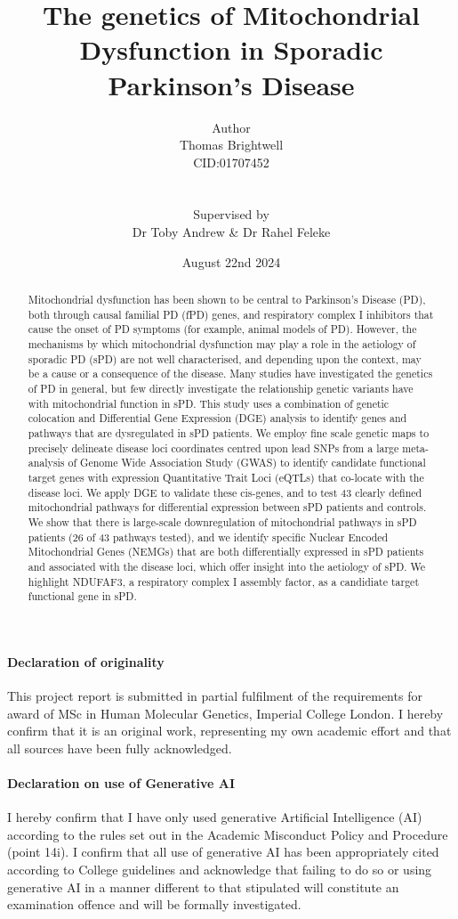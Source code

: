 \documentclass{article}
\title{\textbf{The genetics of Mitochondrial Dysfunction in Sporadic Parkinson's Disease}}
\author{Author
\\Thomas Brightwell
\\CID:01707452
\\
\\
\\Supervised by
\\Dr Toby Andrew & Dr Rahel Feleke}
\date{August 22nd 2024}
\begin{document}
\maketitle
\newpage
\paragraph{Declaration of originality}
This project report is submitted in partial fulfilment of the requirements for award of MSc in Human Molecular Genetics, Imperial College London. I hereby confirm that it is an original work, representing my own academic effort and that all sources have been fully acknowledged.
\paragraph{Declaration on use of Generative AI}
I hereby confirm that I have only used generative Artificial Intelligence (AI) according to the rules set out in the Academic Misconduct Policy and Procedure (point 14i). I confirm that all use of generative AI has been appropriately cited according to College guidelines and acknowledge that failing to do so or using generative AI in a manner different to that stipulated will constitute an examination offence and will be formally investigated.
\newpage
\begin{abstract}
Mitochondrial dysfunction has been shown to be central to Parkinson’s Disease (PD), both through causal familial PD (fPD) genes, and respiratory complex I inhibitors that cause the onset of PD symptoms (for example, animal models of PD). However, the mechanisms by which mitochondrial dysfunction may play a role in the aetiology of sporadic PD (sPD) are not well characterised, and depending upon the context, may be a cause or a consequence of the disease. Many studies have investigated the genetics of PD in general, but few directly investigate the relationship genetic variants have with mitochondrial function in sPD. This study uses a combination of genetic colocation and Differential Gene Expression (DGE) analysis to identify genes and pathways that are dysregulated in sPD patients. We employ fine scale genetic maps to precisely delineate disease loci coordinates centred upon lead SNPs from a large meta-analysis of Genome Wide Association Study (GWAS) to identify candidate functional target genes with expression Quantitative Trait Loci (eQTLs) that co-locate with the disease loci. We apply DGE to validate these cis-genes, and to test 43 clearly defined mitochondrial pathways for differential expression between sPD patients and controls. We show that there is large-scale downregulation of mitochondrial pathways in sPD patients (26 of 43 pathways tested), and we identify specific Nuclear Encoded Mitochondrial Genes (NEMGs) that are both differentially expressed in sPD patients and associated with the disease loci, which offer insight into the aetiology of sPD. We highlight NDUFAF3, a respiratory complex I assembly factor, as a candidiate target functional gene in sPD. 
\end{abstract}
\end{document}
